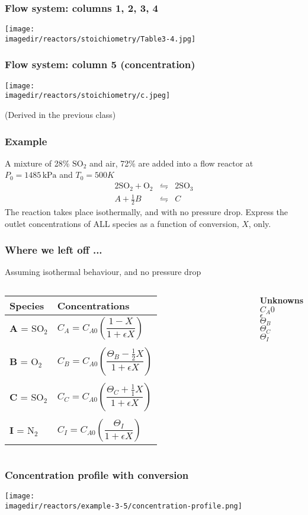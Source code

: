 \begin{frame}\frametitle{Flow system: columns 1, 2, 3, 4}
	\begin{center}
		\texttt{[image: \\imagedir/reactors/stoichiometry/Table3-4.jpg]}
	\end{center}
\end{frame}

\begin{frame}\frametitle{Flow system: column 5 (concentration)}
	\begin{center}
		\texttt{[image: \\imagedir/reactors/stoichiometry/c.jpeg]}
	\end{center}
	(Derived in the previous class)
\end{frame}

\begin{frame}\frametitle{Example}
	A mixture of 28\% $\text{SO}_2$ and air, 72\% are added into a flow reactor at $P_0 = 1485\,\text{kPa}$ and $T_0 = 500K$
	$$\begin{array}{rcl}
		2\text{SO}_2 + \text{O}_2 &\leftrightharpoons& 2\text{SO}_3  \\
		A + \frac{1}{2}B &\leftrightharpoons& C
	\end{array} 
	$$
	The reaction takes place isothermally, and with no pressure drop. Express the outlet concentrations of ALL species as a function of conversion, $X$, only.
	
	\vspace{12pt}
	{\color{myOrange}{Use the table provided to lay out your answer.}}
\end{frame}

\begin{frame}\frametitle{Where we left off ...}
	{\small Assuming isothermal behaviour, and no pressure drop}
	
	\begin{columns}[b]
			\begin{tabular}{l|l}
				\textbf{Species}	&	\textbf{Concentrations} \\ \hline
				\textbf{A} = SO$_2$	&	$C_A = C_{A0}\left(\dfrac{1-X}{1+\epsilon X} \right)$ \\	 \\
				\textbf{B} = O$_2$ 	&	$C_B = C_{A0}\left(\dfrac{\Theta_B-\frac{1}{2}X}{1+\epsilon X} \right)$ \\	\\
				\textbf{C} = SO$_2$	&	$C_C = C_{A0}\left(\dfrac{\Theta_C+\frac{1}{1}X}{1+\epsilon X} \right)$ \\	\\
				\textbf{I} = N$_2$	&	$C_I = C_{A0}\left(\dfrac{\Theta_I}{1+\epsilon X} \right)$
			\end{tabular}
			\textbf{Unknowns}
			\\
			$C_A0$ \\ $\epsilon$ \\ $\Theta_B$ \\ $\Theta_C$ \\ $\Theta_I$
	\end{columns}	
\end{frame}

\begin{frame}\frametitle{Concentration profile with conversion}
	\begin{center}
		\texttt{[image: \\imagedir/reactors/example-3-5/concentration-profile.png]}
	\end{center}
\end{frame}